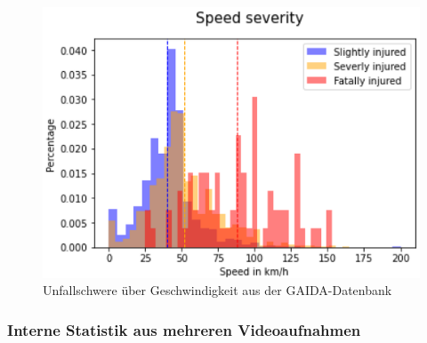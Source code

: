 \begin{figure}[H]
	\centering
	\includegraphics[width=\linewidth]{Bilder/SpeedSeverity.png}
	\caption{Unfallschwere über Geschwindigkeit aus der GAIDA-Datenbank\citep{Maire2020}}
	\label{fig:SpeedSeverity}
\end{figure}


%
%
%

\subsubsection{Interne Statistik aus mehreren Videoaufnahmen}



